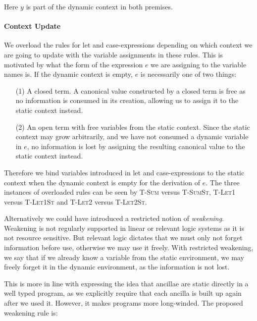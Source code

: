 Here $y$ is part of the dynamic context in both premises.

\paragraph{Context Update}

We overload the rules for let and case-expressions depending on which context
we are going to update with the variable assignments in these rules. This is
motivated by what the form of the expression $e$ we are assigning to the
variable names is. If the dynamic context is empty, $e$ is necessarily one of
two things:

\begin{enumerate}

  \item [(1)] A closed term. A canonical value constructed by a closed term is
    free as no information is consumed in its creation, allowing us to assign
    it to the static context instead.

  \item [(2)] An open term with free variables from the static context. Since
    the static context may grow arbitrarily, and we have not consumed a dynamic
    variable in $e$, no information is lost by assigning the resulting
    canonical value to the static context instead.

\end{enumerate}

Therefore we bind variables introduced in let and case-expressions to the
static context when the dynamic context is empty for the derivation of $e$. The
three instances of overloaded rules can be seen by \textsc{T-Sum} versus
\textsc{T-SumSt}, \textsc{T-Let1} versus \textsc{T-Let1St} and \textsc{T-Let2}
versus \textsc{T-Let2St}.

Alternatively we could have introduced a restricted notion of \emph{weakening}.
Weakening is not regularly supported in linear or relevant logic systems as it
is not resource sensitive. But relevant logic dictates that we must only not
forget information before use, otherwise we may use it freely. With restricted
weakening, we say that if we already know a variable from the static
environment, we may freely forget it in the dynamic environment, as the
information is not lost.

This is more in line with expressing the idea that ancillae are static directly
in a well typed program, as we explicitly require that each ancilla is built
up again after we used it. However, it makes programs more long-winded. The
proposed weakening rule is:

